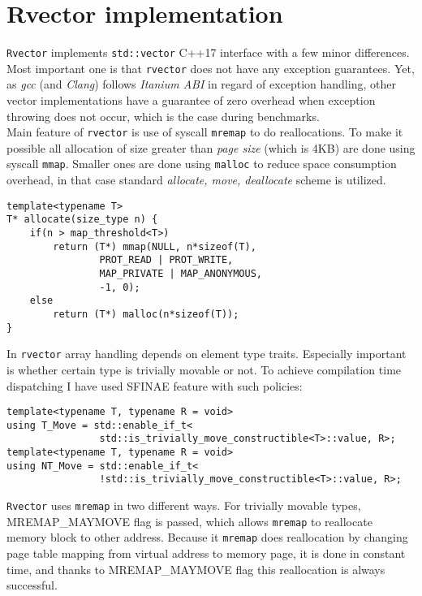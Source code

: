 \documentclass[inz, english, shortabstract]{iithesis}
\begin{document}
\chapter{Rvector implementation}
{\tt Rvector}\cite{rvector_impl} implements {\tt std::vector} C++17 interface with a few minor differences. Most important one is that {\tt rvector} does not have any exception guarantees. Yet, as \emph{gcc} (and \emph{Clang}) follows \emph{Itanium ABI}\cite{Itanium_ABI} in regard of exception handling, other vector implementations have a guarantee of zero overhead when exception throwing does not occur, which is the case during benchmarks. \\
Main feature of {\tt rvector} is use of syscall {\tt mremap} to do reallocations. To make it possible all allocation of size greater than \emph{page size} (which is 4KB) are done using syscall {\tt mmap}. Smaller ones are done using {\tt malloc} to reduce space consumption overhead, in that case standard \emph{allocate, move, deallocate} scheme is utilized.

\begin{lstlisting}[caption=rvector allocation]
template<typename T>
T* allocate(size_type n) {
	if(n > map_threshold<T>)
    	return (T*) mmap(NULL, n*sizeof(T), 
                PROT_READ | PROT_WRITE,
                MAP_PRIVATE | MAP_ANONYMOUS,
                -1, 0);
    else
    	return (T*) malloc(n*sizeof(T));
}
\end{lstlisting}
In {\tt rvector} array handling depends on element type traits. Especially important is whether certain type is trivially movable or not. To achieve compilation time dispatching I have used SFINAE feature with such policies:

\begin{lstlisting}[caption=SFINAE policies]
template<typename T, typename R = void>
using T_Move = std::enable_if_t<
				std::is_trivially_move_constructible<T>::value, R>;
template<typename T, typename R = void>
using NT_Move = std::enable_if_t<
				!std::is_trivially_move_constructible<T>::value, R>;
\end{lstlisting}
{\tt Rvector} uses {\tt mremap} in two different ways. For trivially movable types, MREMAP\_MAYMOVE flag is passed, which allows {\tt mremap} to reallocate memory block to other address. Because it {\tt mremap} does reallocation by changing page table mapping from virtual address to memory page\cite{mremap}, it is done in constant time, and thanks to MREMAP\_MAYMOVE flag this reallocation is always successful. 
\end{document}
